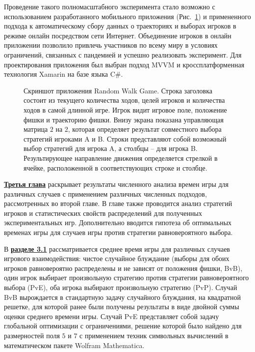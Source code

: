 Проведение такого полномасштабного эксперимента стало возможно с использованием 
разработанного мобильного приложения (Рис.~\cref{fig:screenshot_game_field_ref}) и примененного подхода к автоматическому сбору 
данных о траекториях и выборах игроков в режиме онлайн посредством сети Интернет.
Объединение игроков в онлайн приложении позволило привлечь участников по всему миру в условиях ограничений,
связанных с пандемией и успешно реализовать эксперимент. Для проектирования приложения был
выбран подход MVVM и кроссплатформенная технология Xamarin на базе языка C$\mathsf{\#}$.

\begin{figure}[ht]
    \caption{
        Скриншот приложения Random Walk Game. Строка заголовка состоит из текущего количества ходов, 
        целей игроков и количества ходов в самой длинной игре. Игрок видит игровое поле, положение фишки и траекторию фишки. 
        Внизу экрана показана управляющая матрица $2$ на $2$, которая определяет результат совместного выбора стратегий игроками A и B. 
        Строки представляют собой возможный выбор стратегий для игрока A, а столбцы -- для игрока B. Результирующее направление движения 
        определяется стрелкой в ячейке, расположенной в соответствующих строке и столбце.
    }\label{fig:screenshot_game_field_ref}
\end{figure}

\underline{\textbf{Третья глава}} раскрывает результаты численного анализа времен игры для
различных случаев с применением различных численных подходов, рассмотренных во второй главе.
В главе также проводится анализ стратегий игроков и статистических свойств распределений 
для полученных экспериментальных игр. Дополнительно вводится гипотеза об оптимальных временах игры
для случаев игры против стратегии равновероятного выбора.

В \underline{\textbf{разделе 3.1}} рассматривается среднее время игры для различных случаев игрового взаимодействия:
чистое случайное блуждание (выборы для обоих игроков равновероятно распределены и не зависят от положения фишки, BvB),
один игрок выбирает произвольную стратегию против стратегии равновероятного выбора (PvE), 
оба игрока выбирают произвольную стратегию (PvP). Случай BvB вырождается в стандартную задачу случайного блуждания,
на квадратной решетке, для которой ранее были получены результаты в виде двойной суммы оценки среднего времени игры.
Случай PvE представляет собой задачу глобальной оптимизации с ограничениями, решение которой было найдено
для размерностей поля $5$ и $7$ с применением техник символьных вычислений в математическом пакете Wolfram Mathematica.

